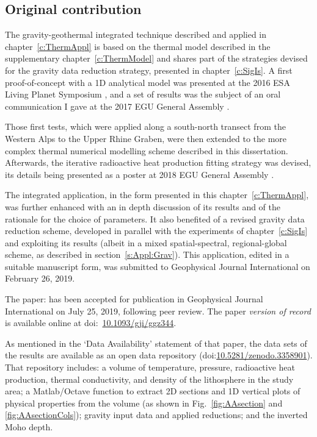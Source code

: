 \subsection*{Original contribution}
The gravity-geothermal integrated technique described and applied in chapter~\ref{c:ThermAppl} is based on the thermal model described in the supplementary chapter~\ref{c:ThermModel} and shares part of the strategies devised for the gravity data reduction strategy, presented in chapter~\ref{c:SigIs}.
A first proof-of-concept with a 1D analytical model was presented at the 2016 ESA Living Planet Symposium \parencite{Pastorutti2016LPS}, and a set of results was the subject of an oral communication I gave at the 2017 EGU General Assembly \parencite{Pastorutti2017_EGUoral}.

Those first tests, which were applied along a south-north transect from the Western Alps to the Upper Rhine Graben, were then extended to the more complex thermal numerical modelling scheme described in this dissertation.
Afterwards, the iterative radioactive heat production fitting strategy was devised, its details being presented as a poster at 2018 EGU General Assembly \parencite{Pastorutti2018_EGUposter}.

The integrated application, in the form presented in this chapter~\ref{c:ThermAppl}, was further enhanced with an in depth discussion of its results and of the rationale for the choice of parameters.
It also benefited of a revised gravity data reduction scheme, developed in parallel with the experiments of chapter~\ref{c:SigIs} and exploiting its results (albeit in a mixed spatial-spectral, regional-global scheme, as described in section~\ref{s:Appl:Grav}).
This application, edited in a suitable manuscript form, was submitted to Geophysical Journal International on February 26, 2019.

The paper:  \parencite{Pastorutti2019} has been accepted for publication in Geophysical Journal International on July 25, 2019, following peer review.
The paper \textit{version of record} is available online at doi:~\href{https://doi.org/10.1093/gji/ggz344}{10.1093/gji/ggz344}.

As mentioned in the `Data Availability' statement of that paper, the data sets of the results are available as an open data repository (doi:\href{https://doi.org/10.5281/zenodo.3358901}{10.5281/zenodo.3358901}).
That repository includes: a volume of temperature, pressure, radioactive heat production, thermal conductivity, and density of the lithosphere in the study area; a Matlab/Octave function to extract 2D sections and 1D vertical plots of physical properties from the volume (as shown in Fig.~\ref{fig:AAsection} and \ref{fig:AAsectionCols}); gravity input data and applied reductions; and the inverted Moho depth.

